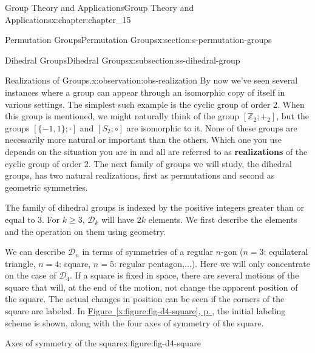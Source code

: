 \documentclass[twoside,10pt,]{book}
\newcommand{\xreffont}{\relax}
\newcommand{\terminology}[1]{\textbf{#1}}
\numberwithin{equation}{section}
\begin{document}
\begin{chapterptx}{Group Theory and Applications}{}{Group Theory and Applications}{}{}{x:chapter:chapter_15}
\begin{sectionptx}{Permutation Groups}{}{Permutation Groups}{}{}{x:section:s-permutation-groups}
\begin{subsectionptx}{Dihedral Groups}{}{Dihedral Groups}{}{}{x:subsection:ss-dihedral-group}
\begin{observation}{Realizations of Groups.}{x:observation:obs-realization}
By now we've seen several instances where a group can appear through an isomorphic copy of itself in various settings.  The simplest such example is the cyclic group of order 2.   When this group is mentioned, we might naturally think of the group \(\left[\mathbb{Z}_2;+_2\right]\), but the groups \([\{-1,1\};\cdot ]\)  and \(\left[S_2;\circ \right]\) are isomorphic to it.  None of these groups are necessarily more natural or important than the others.  Which one you use depends on the situation you are in and all are referred to as \terminology{realizations}  of the cyclic group of order 2.   The next family of groups we will study, the dihedral groups, has two natural realizations, first as permutations and second as geometric symmetries.%
\end{observation}
The family of dihedral groups is indexed by the positive integers greater than or equal to 3.  For \(k \geq 3\), \(\mathcal{D}_k\) will have \(2k\) elements.  We first describe the elements and the operation on them using geometry.%
\par
We can describe \(\mathcal{D}_n\) in terms of symmetries of a regular \(n\)-gon (\(n = 3\): equilateral triangle, \(n = 4\): square, \(n = 5\):  regular pentagon,\(\ldots \)).  Here we will only concentrate on the case of \(\mathcal{D}_4\). If a square is fixed in space, there are several motions of the square that will, at the end of the motion, not change the apparent position of the square. The actual changes in position can be seen if the corners of the square are labeled. In \hyperref[x:figure:fig-d4-square]{Figure~{\xreffont\ref{x:figure:fig-d4-square}}, p.\,\pageref{x:figure:fig-d4-square}}, the initial labeling scheme is shown, along with the four axes of symmetry of the square.%
\begin{figureptx}{Axes of symmetry of the square}{x:figure:fig-d4-square}{}%
\begin{image}{0.15}{0.7}{0.15}%

\end{image}
\end{figureptx}
\end{subsectionptx}
\end{sectionptx}
\end{chapterptx}
\end{document}
